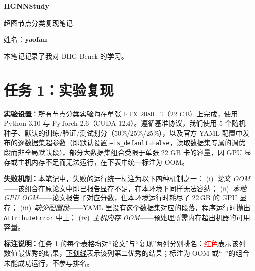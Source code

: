 \documentclass[11pt,a4paper]{article}
\begin{document}
\begin{center}
{\LARGE\bfseries HGNNStudy}\par\vspace{5pt}
{\large 超图节点分类复现笔记}\par\vspace{8pt}
姓名：\textbf{yaofan}
\end{center}

本笔记记录了我对 DHG-Bench\cite{li2026dhg} 的学习。

\section*{任务 1：实验复现}
\textbf{实验设置：}所有节点分类实验均在单张 RTX 2080 Ti（22 GB）上完成，使用 Python 3.10 与 PyTorch 2.6（CUDA 12.4）。遵循基准协议，我们使用 5 个随机种子、默认的训练/验证/测试划分（50\%/25\%/25\%），以及官方 YAML 配置中发布的逐数据集超参数（即默认设置 \texttt{--is\_default=False}，读取数据集专属的调优段而非全局默认段）。部分大数据集组合受限于单张 22 GB 卡的容量，因 GPU 显存或主机内存不足而无法运行，在下表中统一标注为 OOM。

\smallskip\noindent\textbf{失败机制：}本笔记中，失败的运行统一标注为以下四种机制之一：
(i)~\textit{论文 OOM}——该组合在原论文中即已报告显存不足，在本环境下同样无法容纳；
(ii)~\textit{本地 GPU OOM}——论文报告了对应分数，但本环境运行时耗尽了 22\,GB 的 GPU 显存；
(iii)~\textit{缺少配置段}——YAML 里没有这个数据集对应的段落，程序运行时抛出 \texttt{AttributeError} 中止；
(iv)~\textit{主机内存 OOM}——预处理所需内存超出机器的可用容量。

\noindent\textbf{标注说明：}任务 1 的每个表格均对“论文”与“复现”两列分别排名：\textcolor{red}{红色}表示该列数值最优秀的结果，\underline{下划线}表示该列第二优秀的结果；标注为 OOM 或“--”的组合未能成功运行，不参与排名。
\end{document}
